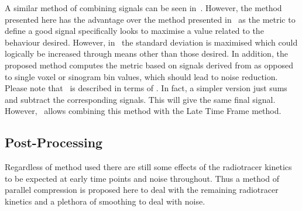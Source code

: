             A similar method of combining signals can be seen in~\cite{Kesner2010AMethods}. However, the method presented here has the advantage over the method presented in~\cite{Kesner2010AMethods} as the metric to define a good signal specifically looks to maximise a value related to the behaviour desired. However, in~\cite{Kesner2010AMethods} the standard deviation is maximised which could logically be increased through means other than those desired. In addition, the proposed method computes the metric based on signals derived from  as opposed to single voxel or sinogram bin values, which should lead to noise reduction. Please note that~ is described in terms of . In fact, a simpler version just sums and subtract the corresponding signals. This will give the same final signal. However,~ allows combining this method with the Late Time Frame method.
        
        
        \subsection{Post-Processing} \label{sec:post_processing}
            Regardless of method used there are still some effects of the radiotracer kinetics to be expected at early time points and noise throughout. Thus a method of parallel compression is proposed here to deal with the remaining radiotracer kinetics and a plethora of smoothing to deal with noise.
            
